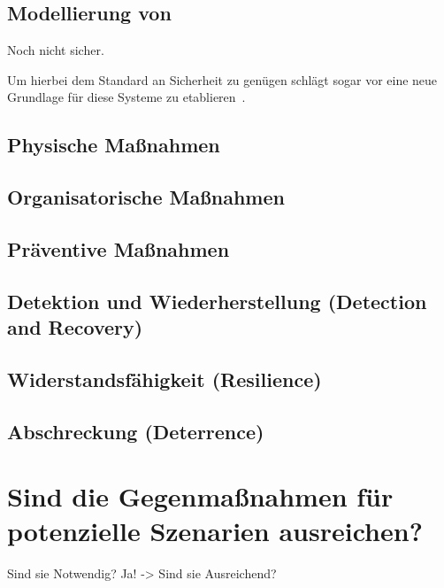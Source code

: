 \documentclass[final,bibliography=totocnumbered]{include/sikseminar}
\begin{document}



\subsection{Modellierung von }\label{subsec:modellierung}
Noch nicht sicher.

Um hierbei dem Standard an Sicherheit zu genügen schlägt \citeauthor{Lee08} sogar vor eine neue Grundlage für diese Systeme zu etablieren~\cite{Lee08}.

\subsection{Physische Maßnahmen}\label{subsec:physisch}

\subsection{Organisatorische Maßnahmen}\label{subsec:orga}

\subsection{Präventive Maßnahmen}\label{subsec:präventiv}

\subsection{Detektion und Wiederherstellung (Detection and Recovery)}\label{subsec:detektion}

\subsection{Widerstandsfähigkeit (Resilience)}\label{subsec:widerstand} %


\subsection{Abschreckung (Deterrence)}\label{subsec:abschreckung} %

\section{Sind die Gegenmaßnahmen für potenzielle Szenarien ausreichen?}\label{sec:diskussion}

Sind sie Notwendig?
Ja! -> Sind sie Ausreichend?

\newpage
\printglossary[type=\acronymtype]
~\nocite{*}

\printbibliography
\newpage
\end{document}
